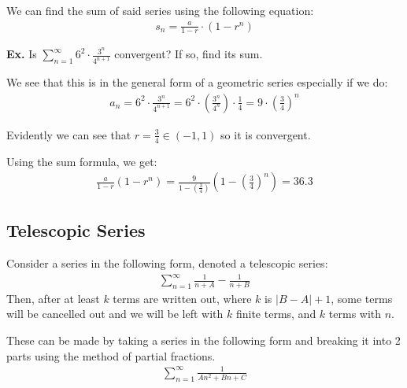 \documentclass[12pt,letterpaper]{article} \usepackage{amsmath} \usepackage{graphicx}  \usepackage{longtable}  \usepackage{amssymb}
\begin{document}
        We can find the sum of said series using the following equation:
        \begin{align*}
            s_n = \frac{a}{1-r} \cdot (1-r^n)
        \end{align*}

        \begin{mdframed}
            \textbf{Ex.} Is $\sum^{\infty}_{n=1}6^2 \cdot \frac{3^n}{4^{n+1}}$ convergent? If so, find its sum.

            We see that this is in the general form of a geometric series especially if we do:
            \begin{align*}
                a_n = 6^2 \cdot \frac{3^n}{4^{n+1}} = 6^2 \cdot \left(\frac{3^n}{4^n}\right) \cdot \frac{1}{4} = 9\cdot\left(\frac{3}{4}\right)^n
            \end{align*}

            Evidently we can see that $r=\frac{3}{4} \in (-1,1)$ so it is convergent. 

            Using the sum formula, we get:
            \begin{align*}
                \frac{a}{1-r}(1-r^n) = \frac{9}{1-\left(\frac{3}{4}\right)}\left(1-\left(\frac{3}{4}\right)^n\right) = 36.3
            \end{align*}
        \end{mdframed}

        \subsection{Telescopic Series}
        Consider a series in the following form, denoted a telescopic series:
        \begin{align*}
            \sum _ {n=1} ^{\infty} \frac{1}{n+A} - \frac{1}{n+B}
        \end{align*}
        Then, after at least $k$ terms are written out, where $k$ is $|B-A|+1$, some terms will be cancelled out and we will be left with $k$ finite terms, and $k$ terms with $n$.

        These can be made by taking a series in the following form and breaking it into 2 parts using the method of partial fractions.
        \begin{align*}
            \sum _ {n=1} ^{\infty} \frac{1}{An^2+Bn+C}
        \end{align*}
\end{document}
